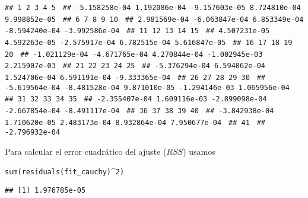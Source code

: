 \documentclass[
  title=normal,
  notoc,
  nobib,
  degree=mecinf]{mnye}
\newenvironment{Shaded}{\begin{snugshade}}{\end{snugshade}}
\newcommand{\DecValTok}[1]{\textcolor[rgb]{0.00,0.00,0.81}{#1}}
\newcommand{\FunctionTok}[1]{\textcolor[rgb]{0.00,0.00,0.00}{#1}}
\newcommand{\NormalTok}[1]{#1}
\newcommand{\SpecialCharTok}[1]{\textcolor[rgb]{0.00,0.00,0.00}{#1}}
\renewcommand{\DecValTok}[1]{\textcolor[RGB]{64, 160, 112}{\texttt{#1}}}
\renewcommand{\FunctionTok}[1]{\textcolor[rgb]{0.13,0.29,0.53}{\texttt{#1}}}
\renewcommand{\NormalTok}[1]{\texttt{#1}}
\begin{document}
\begin{Shaded}
\begin{Highlighting}[]
\NormalTok{\#\#             1             2             3             4             5 }
\NormalTok{\#\# {-}5.158258e{-}04  1.192086e{-}04 {-}9.157603e{-}05  8.724810e{-}04  9.998852e{-}05 }
\NormalTok{\#\#             6             7             8             9            10 }
\NormalTok{\#\#  2.981569e{-}04 {-}6.063847e{-}04  6.853349e{-}04 {-}8.594240e{-}04 {-}3.992586e{-}04 }
\NormalTok{\#\#            11            12            13            14            15 }
\NormalTok{\#\#  4.507231e{-}05  4.592263e{-}05 {-}2.575917e{-}04  6.782515e{-}04  5.616847e{-}05 }
\NormalTok{\#\#            16            17            18            19            20 }
\NormalTok{\#\# {-}1.021129e{-}04 {-}4.671765e{-}04  4.270844e{-}04 {-}1.002945e{-}03  2.215907e{-}03 }
\NormalTok{\#\#            21            22            23            24            25 }
\NormalTok{\#\# {-}5.376294e{-}04  6.594862e{-}04  1.524706e{-}04  6.591191e{-}04 {-}9.333365e{-}04 }
\NormalTok{\#\#            26            27            28            29            30 }
\NormalTok{\#\# {-}5.619564e{-}04 {-}8.481528e{-}04  9.871010e{-}05 {-}1.294146e{-}03  1.065956e{-}04 }
\NormalTok{\#\#            31            32            33            34            35 }
\NormalTok{\#\# {-}2.355407e{-}04  1.609116e{-}03 {-}2.899098e{-}04 {-}2.667854e{-}04 {-}8.491117e{-}04 }
\NormalTok{\#\#            36            37            38            39            40 }
\NormalTok{\#\# {-}3.842938e{-}04  1.710620e{-}05  2.483173e{-}04  8.932864e{-}04  7.950677e{-}04 }
\NormalTok{\#\#            41 }
\NormalTok{\#\# {-}2.796932e{-}04}
\end{Highlighting}
\end{Shaded}

Para calcular el error cuadrático del ajuste (\(RSS\)) usamos

\begin{Shaded}
\begin{Highlighting}[]
\FunctionTok{sum}\NormalTok{(}\FunctionTok{residuals}\NormalTok{(fit\_cauchy)}\SpecialCharTok{\^{}}\DecValTok{2}\NormalTok{)}
\end{Highlighting}
\end{Shaded}

\begin{Shaded}
\begin{Highlighting}[]
\NormalTok{\#\# [1] 1.976785e{-}05}
\end{Highlighting}
\end{Shaded}
\end{document}
